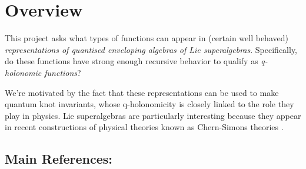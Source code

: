 \documentclass[a4paper]{article}
\begin{document}
\vspace{1cm}

\section*{Overview}
This project asks what types of functions can appear in (certain well behaved) \emph{representations of quantised enveloping algebras of Lie superalgebras}.
Specifically, do these functions have strong enough recursive behavior to qualify as \emph{q-holonomic functions}?

We're motivated by the fact that these representations can be used to make quantum knot invariants, whose q-holonomicity is closely linked to the role they play in physics.
Lie superalgebras are particularly interesting because they appear in recent constructions of physical theories known as Chern-Simons theories \cite{Mikhaylov_Witten_2015}.

\subsection*{Main References:}
\end{document}
